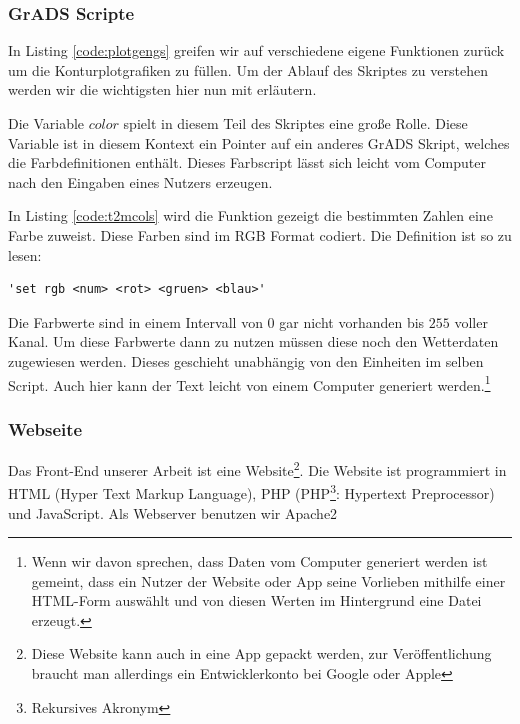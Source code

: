 \documentclass[a4paper,oneside,12pt,titlepage]{article}
\newcommand{\pyvidir}{../../Code/PyVi/}	%
\begin{document}
\subsubsection*{GrADS Scripte}


In Listing \ref{code:plotgengs} greifen wir auf verschiedene eigene Funktionen zurück um die Konturplotgrafiken zu füllen. Um der Ablauf des Skriptes zu verstehen werden wir die wichtigsten hier nun mit erläutern.

Die Variable $color$ spielt in diesem Teil des Skriptes eine große Rolle. Diese Variable ist in diesem Kontext ein Pointer auf ein anderes GrADS Skript, welches die Farbdefinitionen enthält. Dieses Farbscript lässt sich leicht vom Computer nach den Eingaben eines Nutzers erzeugen.

In Listing \ref{code:t2mcols} wird die Funktion gezeigt die bestimmten Zahlen eine Farbe zuweist. Diese Farben sind im RGB Format codiert. Die Definition ist so zu lesen:

\begin{lstlisting}[language=grads]
	'set rgb <num> <rot> <gruen> <blau>'
\end{lstlisting}

Die Farbwerte sind in einem Intervall von $0$ gar nicht vorhanden bis $255$ voller Kanal. Um diese Farbwerte dann zu nutzen müssen diese noch den Wetterdaten zugewiesen werden. Dieses geschieht unabhängig von den Einheiten im selben Script. Auch hier kann der Text leicht von einem Computer generiert werden.\footnote{Wenn wir davon sprechen, dass Daten vom Computer generiert werden ist gemeint, dass ein Nutzer der Website oder App seine Vorlieben mithilfe einer HTML-Form auswählt und von diesen Werten im Hintergrund eine Datei erzeugt.}


\subsubsection*{Webseite}
Das Front-End unserer Arbeit ist eine Website\footnote{Diese Website kann auch in eine App gepackt werden, zur Veröffentlichung braucht man allerdings ein Entwicklerkonto bei Google oder Apple}. Die Website ist programmiert in HTML (Hyper Text Markup Language), PHP (PHP\footnote{Rekursives Akronym}: Hypertext Preprocessor) und JavaScript. Als Webserver benutzen wir Apache2 \cite{php} \cite{apache} \\
\end{document}
